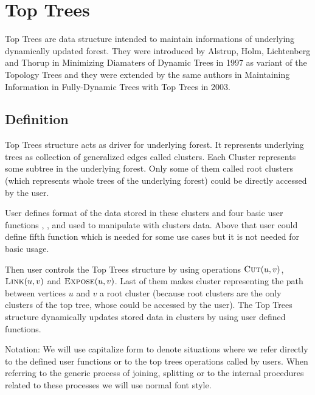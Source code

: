 \chapter{Top Trees}
\label{chap:TopTrees}

Top Trees are data structure intended to maintain informations of underlying
dynamically updated forest. They were introduced by Alstrup, Holm, Lichtenberg
and Thorup in {\I Minimizing Diamaters of Dynamic Trees}
\cite{MinimizingDiamatersOfDynamicTrees} in 1997 as variant of the Topology
Trees and they were extended by the same authors in
{\I Maintaining Information in Fully-Dynamic Trees with Top Trees} \cite{TopTrees} in 2003.

\section{Definition}

{\I Top Trees structure} acts as driver for underlying forest. It represents
underlying trees as collection of generalized edges called {\I clusters}. Each
{\I Cluster} represents some subtree in the underlying forest. Only
some of them called {\I root clusters} (which represents whole trees of the
underlying forest) could be directly accessed by the user.

User defines format of the data stored in these clusters and four basic
{\I user functions} \Create, \Destroy, \Join{} and \Split{} used to
manipulate with clusters data. Above that user could define fifth function
\Choose{} which is needed for some use cases but it is not needed for basic
usage.

Then user controls the Top Trees structure by using {\I operations} $\hbox{\sc Cut}(u,v)$,
$\hbox{\sc Link}(u,v)$ and $\hbox{\sc Expose}(u,v)$. Last of them
makes cluster representing the path between vertices $u$ and $v$ a root cluster
(because root clusters are the only clusters of the top tree, whose could be
accessed by the user). The Top Trees structure dynamically updates stored data
in clusters by using user defined functions.

{\I Notation: We will use capitalize form to denote situations where we refer
directly to the defined user functions or to the top trees operations called by
users. When referring to the generic process of joining, splitting or to the
internal procedures related to these processes we will use normal font style.}



